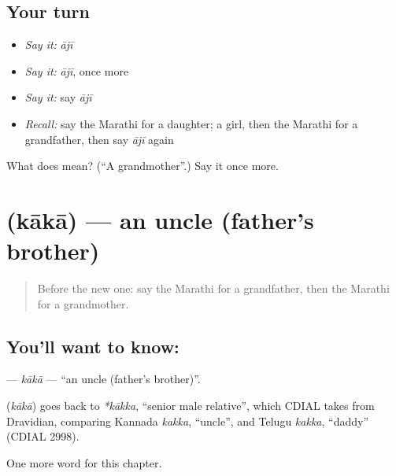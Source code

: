 \subsection*{Your turn}
\begin{itemize}
\raggedright
  \item \emph{Say it:} \emph{ājī}
  \item \emph{Say it:} \emph{ājī}, once more
  \item \emph{Say it:} say \emph{ājī}
  \item \emph{Recall:} say the Marathi for a daughter; a girl, then the Marathi for a grandfather, then say \emph{ājī} again
\end{itemize}

\begin{tcolorbox}[breakable,colback=teal!4,colframe=teal!35!black,title={Before you move on}]
What does  mean? (\textquotedblleft{}A grandmother\textquotedblright{}.) Say it once more.
\end{tcolorbox}
\section[\texorpdfstring{\mr{काका} (kākā)}{काका (kākā)}]{ (kākā) — an uncle (father's brother)}

\label{lesson:MR-C75-kaka}



\begin{quote}
Before the new one: say the Marathi for a grandfather, then the Marathi for a grandmother.
\end{quote}

\subsection*{You'll want to know: }
\textbf{} — \emph{kākā} — \textquotedblleft{}an uncle (father's brother)\textquotedblright{}.

\begin{cousinweb}
\textbf{} (\emph{kākā}) goes back to \emph{*kākka}, \textquotedblleft{}senior male relative\textquotedblright{}, which CDIAL takes from Dravidian, comparing Kannada \emph{kakka}, \textquotedblleft{}uncle\textquotedblright{}, and Telugu \emph{kakka}, \textquotedblleft{}daddy\textquotedblright{} (CDIAL 2998).
\end{cousinweb}

\begin{grammarlens}[title={What you've built}]
One more word for this chapter.
\end{grammarlens}


